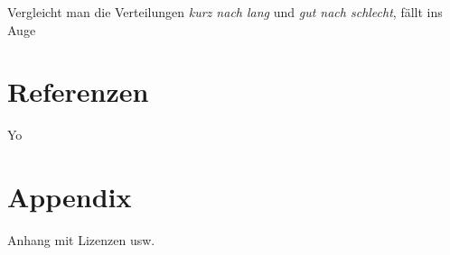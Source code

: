 \documentclass{Paper}
\begin{document}
Vergleicht man die Verteilungen \textit{kurz nach lang} und \textit{gut nach schlecht}, fällt ins Auge	

\section{Referenzen}
	Yo
	
\section{Appendix} %
	Anhang mit Lizenzen usw.
	
\vfill %

\printbibliography
\end{document}
